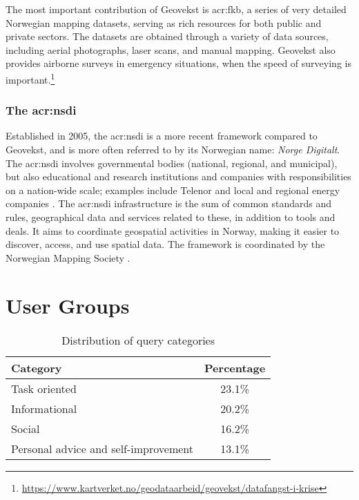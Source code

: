 The most important contribution of Geovekst is \gls{acr:fkb}, a series of very detailed Norwegian mapping datasets, serving as rich resources for both public and private sectors. The datasets are obtained through a variety of data sources, including aerial photographs, laser scans, and manual mapping. Geovekst also provides airborne surveys in emergency situations, when the speed of surveying is important.\footnote{\url{https://www.kartverket.no/geodataarbeid/geovekst/datafangst-i-krise}}

\subsubsection[The National Spatial Data Infrastructure]{The \acrlong{acr:nsdi}}\label{subsubsec:norge-digitalt}

Established in 2005, the \gls{acr:nsdi} is a more recent framework compared to Geovekst, and is more often referred to by its Norwegian name: \textit{Norge Digitalt}. The \gls{acr:nsdi} involves governmental bodies (national, regional, and municipal), but also educational and research institutions and companies with responsibilities on a nation-wide scale; examples include Telenor and local and regional energy companies \citep[6]{norgedigitaltGenerelleVilkarNorge2023}. The \gls{acr:nsdi} infrastructure is the sum of common standards and rules, geographical data and services related to these, in addition to tools and deals. It aims to coordinate geospatial activities in Norway, making it easier to discover, access, and use spatial data. The framework is coordinated by the Norwegian Mapping Society \citep{norgedigitaltGenerelleVilkarNorge2023}.



\section{User Groups}\label{sec:user-groups}

\begin{table}[ht]
    \centering
    \begin{tabular}{l|c}
        \toprule
        \textbf{Category}                    & \textbf{Percentage} \\
        \midrule
        Task oriented                        & 23.1\%              \\
        Informational                        & 20.2\%              \\
        Social                               & 16.2\%              \\
        Personal advice and self-improvement & 13.1\%              \\
        \bottomrule
    \end{tabular}
    \caption{Distribution of query categories \citep{kumarWhatArePeople2023a}}
    \label{tbl:query-category-distribution}
\end{table}

